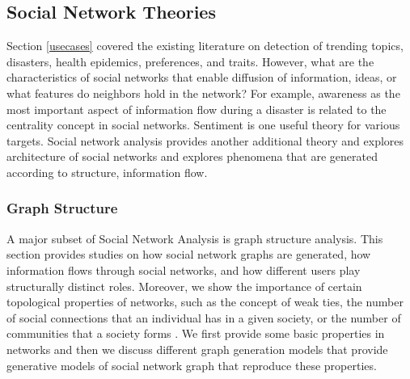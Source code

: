 \documentclass[11pt,a4paper]{article}
\begin{document}
\subsection{Social Network Theories}

Section \ref{usecases} covered the existing literature on detection of trending topics, disasters, health epidemics, preferences, and traits. However, what are the characteristics of social networks that enable diffusion of information, ideas, or what features do neighbors hold in the network? For example,  awareness as the most important aspect of information flow during a disaster is related to the centrality concept in social networks. Sentiment is one useful theory for various targets. Social network analysis provides another additional theory and explores architecture of social networks and explores phenomena that are generated according to structure, information flow.

\subsubsection{Graph Structure}
\label{friendshipParadox}

A major subset of Social Network Analysis is graph structure analysis. This section provides studies on how social network graphs are generated, how information flows through social networks, and how different users play structurally distinct roles. Moreover, we show the importance of certain topological properties of networks, such as the concept of weak ties, the number of social connections that an individual has in a given society, or the number of communities that a society forms \cite{kleinberg, wangStructure}. We first provide some basic properties in networks and then we discuss different graph generation models that provide generative models of social network graph that reproduce these properties.
\end{document}
